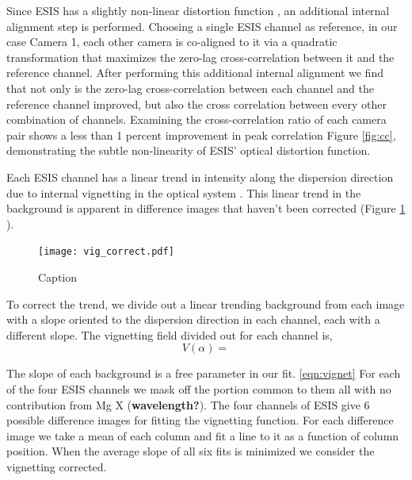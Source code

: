     	Since ESIS has a slightly non-linear distortion function \citep{ESIS}, an additional internal alignment step is performed.
    	Choosing a single ESIS channel as reference, in our case Camera 1, each other camera is co-aligned to it via a quadratic transformation that maximizes the zero-lag cross-correlation between it and the reference channel.
    	After performing this additional internal alignment we find that not only is the zero-lag cross-correlation between each channel and the reference channel improved, but also the cross correlation between every other combination of channels.
    	Examining the cross-correlation ratio of each camera pair shows a less than 1 percent improvement in peak correlation Figure \ref{fig:cc}, demonstrating the subtle non-linearity of ESIS' optical distortion function.
    

	       
        	
        Each ESIS channel has a linear trend in intensity along the dispersion direction due to internal vignetting in the optical system \citep{ESIS}.
        This linear trend in the background is apparent in difference images that haven't been corrected (Figure \ref{fig:vig_correct} ).
        
 		\begin{figure}[htb!]
        	\centering
        	\texttt{[image: vig\_correct.pdf]}
        	\caption{Caption}
        	\label{fig:vig_correct}
        \end{figure}
        
        
        To correct the trend, we divide out a linear trending background from each image with a slope oriented to the dispersion direction in each channel, each with a different slope.
        The vignetting field divided out for each channel is,
            \begin{equation}
                V(\alpha) = 
                \label{eqn:vignet}
            \end{equation}
        
        The slope of each background is a free parameter in our fit. \ref{eqn:vignet}
        For each of the four ESIS channels we mask off the portion common to them all with no contribution from Mg X (\textbf{wavelength?}).
        The four channels of ESIS give 6 possible difference images for fitting the vignetting function. 
        For each difference image we take a mean of each column and fit a line to it as a function of column position.
        When the average slope of all six fits is minimized we consider the vignetting corrected. 
        

